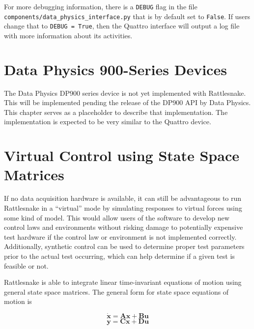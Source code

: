 \documentclass[pdf,12pt,report]{SANDreport}
\newcommand{\inlineCode}{\lstinline[basicstyle=\bfseries\ttfamily]}
\begin{document}
    For more debugging information, there is a \inlineCode{DEBUG} flag in the file \inlineCode{components/data_physics_interface.py} that is by default set to \inlineCode{False}.  If users change that to \inlineCode{DEBUG = True}, then the Quattro interface will output a log file with more information about its activities.
    
    \chapter{Data Physics 900-Series Devices}\label{sec:rattlesnake_hardware_dp900}
    
    The Data Physics DP900 series device is not yet implemented with Rattlesnake.  This will be implemented pending the release of the DP900 \ac{API} by Data Physics.  This chapter serves as a placeholder to describe that implementation.  The implementation is expected to be very similar to the Quattro device.

    \chapter{Virtual Control using State Space Matrices}\label{sec:rattlesnake_hardware_state_space}
    
    If no data acquisition hardware is available, it can still be advantageous to run Rattlesnake in a ``virtual'' mode by simulating responses to virtual forces using some kind of model.  This would allow users of the software to develop new control laws and environments without risking damage to potentially expensive test hardware if the control law or environment is not implemented correctly.  Additionally, synthetic control can be used to determine proper test parameters prior to the actual test occurring, which can help determine if a given test is feasible or not.
    
    Rattlesnake is able to integrate linear time-invariant equations of motion using general state space matrices.  The general form for state space equations of motion is 
    
    \begin{equation}\label{eq:state_eoms}
        \dot{\mathbf{x}} = \mathbf{A}\mathbf{x} + \mathbf{B}\mathbf{u}
    \end{equation}
    \begin{equation}\label{eq:output_eoms}
        \mathbf{y} = \mathbf{C}\mathbf{x} + \mathbf{D}\mathbf{u}
    \end{equation}
    
\end{document}
